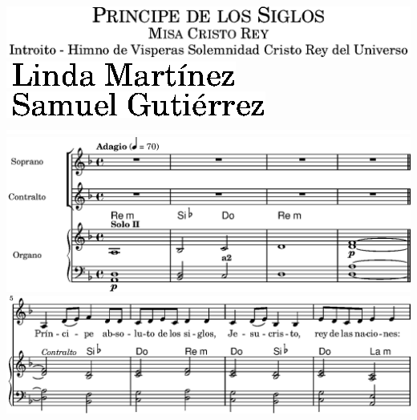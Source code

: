 \includegraphics{05/lily-8a2afe59-1}%
\ifx\betweenLilyPondSystem \undefined
  \linebreak
\else
  \expandafter{}%
\fi
\includegraphics{05/lily-8a2afe59-2}%
\ifx\betweenLilyPondSystem \undefined
  \linebreak
\else
  \expandafter{}%
\fi
\includegraphics{05/lily-8a2afe59-3}%
\ifx\betweenLilyPondSystem \undefined
  \linebreak
\else
  \expandafter{}%
\fi
\includegraphics{05/lily-8a2afe59-4}%
\ifx\betweenLilyPondSystem \undefined
  \linebreak
\else
  \expandafter{}%
\fi
\includegraphics{05/lily-8a2afe59-5}%
\ifx\betweenLilyPondSystem \undefined
  \linebreak
\else
  \expandafter{}%
\fi
\includegraphics{05/lily-8a2afe59-6}%
\ifx\betweenLilyPondSystem \undefined
  \linebreak
